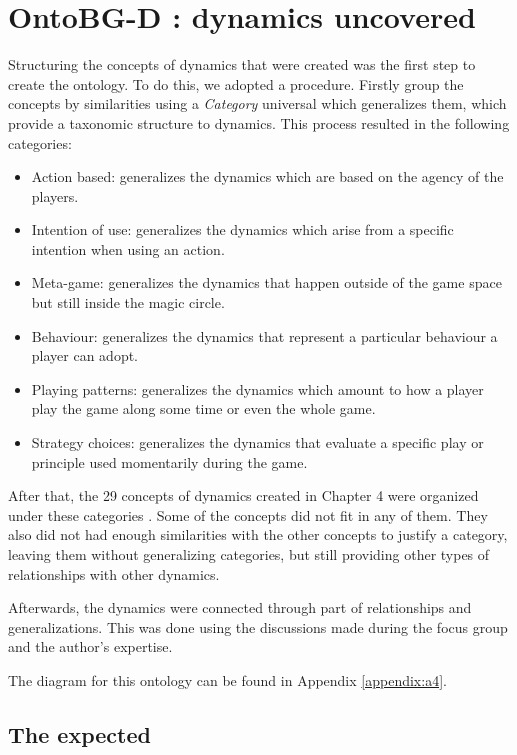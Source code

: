 \section{OntoBG-D : dynamics uncovered}

Structuring the concepts of dynamics that were created was the first step to create the ontology. To do this, we adopted a procedure. Firstly group the concepts by similarities using a \textit{Category} universal which generalizes them, which provide a taxonomic structure to dynamics. This process resulted in the following categories:
\begin{itemize}
    \item Action based: generalizes the dynamics which are based on the agency of the players.
    \item Intention of use: generalizes the dynamics which arise from a specific intention when using an action.
    \item Meta-game: generalizes the dynamics that happen outside of the game space but still inside the magic circle.
    \item Behaviour: generalizes the dynamics that represent a particular behaviour a player can adopt.
    \item Playing patterns: generalizes the dynamics which amount to how a player play the game along some time or even the whole game.
    \item Strategy choices: generalizes the dynamics that evaluate a specific play or principle used momentarily during the game.
\end{itemize}

After that, the 29 concepts of dynamics created in Chapter 4 were organized under these categories    . Some of the concepts did not fit in any of them. They also did not had enough similarities with the other concepts to justify a category, leaving them without generalizing categories, but still providing other types of relationships with other dynamics.

Afterwards, the dynamics were connected through part of relationships and generalizations. This was done using the discussions made during the focus group and the author's expertise. 

The diagram for this ontology can be found in Appendix \autoref{appendix:a4}.

\subsection{The expected}

